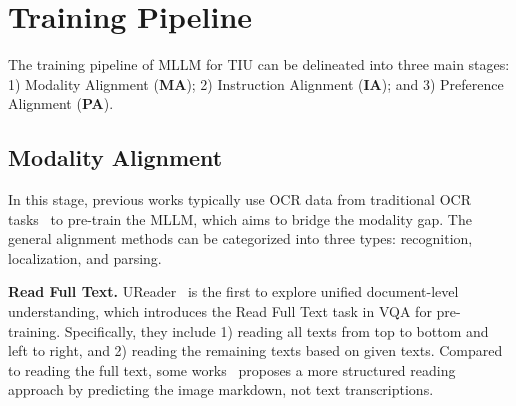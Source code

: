 \section{Training Pipeline}
\label{sec:training_pipeline}
The training pipeline of MLLM for TIU can be delineated into three main stages: 1) Modality Alignment (\textbf{MA}); 2) Instruction Alignment (\textbf{IA}); and 3) Preference Alignment ({\textbf{PA}}).

\subsection{Modality Alignment}
In this stage, previous works typically use OCR data from traditional OCR tasks~\cite{guan2024bridging,guan2023ccd} to pre-train the MLLM, which aims to bridge the modality gap. The general alignment methods can be categorized into three types: recognition, localization, and parsing.

\noindent \textbf{Read Full Text.} UReader~\cite{ye2023ureader} is the first to explore unified document-level understanding, which introduces the Read Full Text task in VQA for pre-training. Specifically, they include 1) reading all texts from top to bottom and left to right, and 2) reading the remaining texts based on given texts.
Compared to reading the full text, some works~\cite{Lv2024ARXIV_KOSMOS_2_5, Hu2024ARXIV_mPLUG_DocOwl_1} proposes a more structured reading approach by predicting the image markdown, not text transcriptions.

